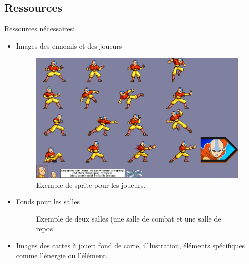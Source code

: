 \subsection{Ressources}

Ressources nécessaires:
\begin{itemize}
    \item Images des ennemis et des joueurs
    
\begin{figure}[h]
\begin{center}
\includegraphics[scale = 0.3]{images/Aang.png}
\caption{\label{uml:state}Exemple de sprite pour les joueurs.} 
\end{center}
\end{figure}

    \item Fonds pour les salles
    
\begin{figure}[h]
\begin{center}
%
\qquad
{}%
\caption{\label{slaythespiregame}Exemple de deux salles (une salle de combat et une salle de repos}
\end{center}
\end{figure}
    \newpage
    \item Images des cartes à jouer: fond de carte, illlustration, éléments spécifiques comme l'énergie ou l'élément.
    

\end{itemize}
